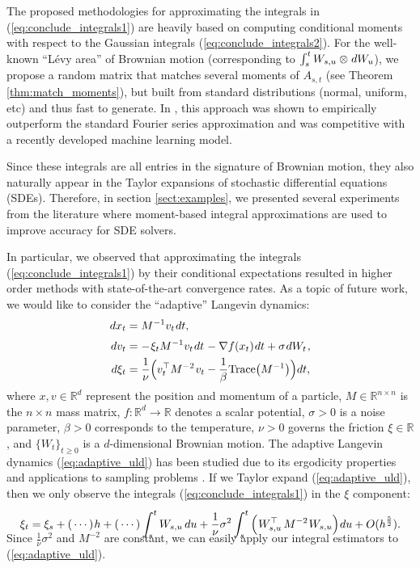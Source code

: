 \documentclass[sn-mathphys-num]{sn-jnl}%
\newcommand{\R}{\mathbb{R}}
\newcommand{\m}{\hspace{0.25mm}}
\begin{document}
The proposed methodologies for approximating the integrals in (\ref{eq:conclude_integrals1}) are heavily based on computing conditional moments with respect to the Gaussian integrals (\ref{eq:conclude_integrals2}).
For the well-known ``L\'{e}vy area'' of Brownian motion (corresponding to $\int_s^t W_{s,u} \otimes\m dW_u$), we propose a random matrix that matches several moments of $A_{s,t}$ (see Theorem \ref{thm:match_moments}),
but built from standard distributions (normal, uniform, etc) and thus fast to generate. 
In \cite{jelincic2025levygan}, this approach was shown to empirically outperform the standard Fourier series approximation and was competitive with a recently developed machine learning model.\medbreak

Since these integrals are all entries in the signature of Brownian motion, they also naturally appear in the Taylor expansions of stochastic differential equations (SDEs).
Therefore, in section \ref{sect:examples}, we presented several experiments from the literature where moment-based integral approximations are used to improve accuracy for SDE solvers.

\noindent
In particular, we observed that approximating the integrals (\ref{eq:conclude_integrals1}) by their conditional expectations resulted in higher order methods with state-of-the-art convergence rates.
As a topic of future work, we would like to consider the ``adaptive'' Langevin dynamics:\vspace{-1mm}
\begin{align}\label{eq:adaptive_uld}
dx_t & = M^{-1}v_t\m dt,\\[2pt]
dv_t & = - \m\xi_t M^{-1}v_t\m dt\m -\nabla f(x_t)\m dt + \sigma\m dW_t\m,\nonumber\\
d\xi_t & = \frac{1}{\nu}\Big(v_t^{\top} M^{-2}\m v_t - \frac{1}{\beta}\mathrm{Trace}\big(M^{-1}\big)\Big) dt,\nonumber\\[-18pt]\nonumber
\end{align}
where $x,v\in\R^d$ represent the position and momentum of a particle, $M\in\R^{n\times n}$ is the $n\times n$ mass matrix, $f:\R^d\rightarrow\R$ denotes a scalar potential, $\sigma > 0$ is a noise parameter, $\beta > 0$ corresponds to the temperature, $\nu > 0$ governs the friction $\xi\in\R$, and $\{W_t\}_{t\geq 0}$ is a $d$-dimensional Brownian motion.
The adaptive Langevin dynamics (\ref{eq:adaptive_uld}) has been studied due to its ergodicity properties and applications to sampling problems \cite{jones2011adaptivelangevin, leimkuhler2020adaptivelangevin1, leimkuhler2020adaptivelangevin2}.
If we Taylor expand (\ref{eq:adaptive_uld}), then we only observe the integrals (\ref{eq:conclude_integrals1}) in the $\xi$ component:\vspace{-1mm}
\begin{align*}
\xi_t = \xi_s + (\,\cdots)\m h + (\,\cdots)\int_s^t W_{s,u}\,du + \frac{1}{\nu}\sigma^2\int_s^t \Big(\m W_{s,u}^{\top}\, M^{-2}\m W_{s,u}\Big)\m du + O(h^\frac{5}{2}).\\[-16pt]
\end{align*}
Since $\frac{1}{\nu}\sigma^2$ and $M^{-2}$ are constant, we can easily apply our integral estimators to (\ref{eq:adaptive_uld}).

\smallbreak

\end{document}
